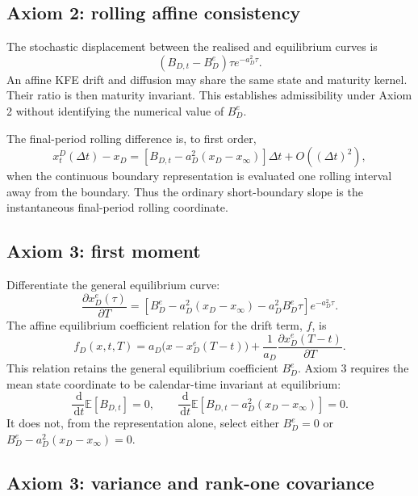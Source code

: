 \documentclass[12pt]{article}
\numberwithin{equation}{subsection}
\newcommand{\E}{\mathbb{E}}
\newcommand{\dd}{\,\mathrm{d}}
\begin{document}
\subsection{Axiom 2: rolling affine consistency}

The stochastic displacement between the realised and equilibrium curves is
\begin{equation}
(B_{D,t}-B_D^e)\tau e^{-a_D^2\tau}.
\end{equation}
An affine KFE drift and diffusion may share the same state and maturity kernel. Their ratio is then maturity invariant. This establishes admissibility under Axiom 2 without identifying the numerical value of $B_D^e$.

The final-period rolling difference is, to first order,
\begin{equation}
x^D_t(\Delta t)-x_D
=
\left[B_{D,t}-a_D^2(x_D-x_\infty)\right]\Delta t
+O((\Delta t)^2),
\end{equation}
when the continuous boundary representation is evaluated one rolling interval away from the boundary. Thus the ordinary short-boundary slope is the instantaneous final-period rolling coordinate.

\subsection{Axiom 3: first moment}

Differentiate the general equilibrium curve:
\begin{equation}
\frac{\partial x_D^e(\tau)}{\partial T}
=
\left[
B_D^e-a_D^2(x_D-x_\infty)-a_D^2B_D^e\tau
\right]e^{-a_D^2\tau}.
\end{equation}
The affine equilibrium coefficient relation for the drift term, $f$, is
\begin{equation}
f_D(x,t,T)
=
a_D\bigl(x-x_D^e(T-t)\bigr)
+
\frac{1}{a_D}\frac{\partial x_D^e(T-t)}{\partial T}.
\end{equation}
This relation retains the general equilibrium coefficient $B_D^e$. Axiom 3 requires the mean state coordinate to be calendar-time invariant at equilibrium:
\begin{equation}
\frac{\dd}{\dd t}\E[B_{D,t}]=0,
\qquad
\frac{\dd}{\dd t}\E[B_{D,t}-a_D^2(x_D-x_\infty)]=0.
\end{equation}
It does not, from the representation alone, select either $B_D^e=0$ or $B_D^e-a_D^2(x_D-x_\infty)=0$.

\subsection{Axiom 3: variance and rank-one covariance}
\end{document}
